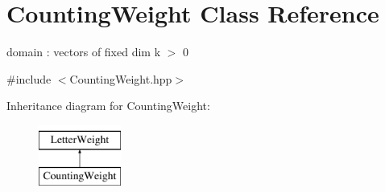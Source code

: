 \hypertarget{classCountingWeight}{}\section{Counting\+Weight Class Reference}
\label{classCountingWeight}


domain \+: vectors of fixed dim k $>$ 0  




{\ttfamily \#include $<$Counting\+Weight.\+hpp$>$}

Inheritance diagram for Counting\+Weight\+:\begin{figure}[H]
\begin{center}
\leavevmode
\includegraphics[height=2.000000cm]{classCountingWeight}
\end{center}
\end{figure}
